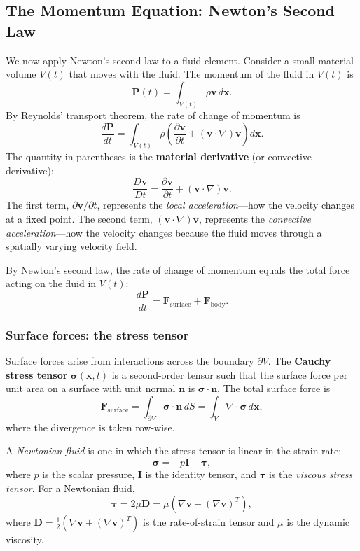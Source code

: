\subsection{The Momentum Equation: Newton's Second Law}

We now apply Newton's second law to a fluid element. Consider a small material volume $V(t)$ that moves with the fluid. The momentum of the fluid in $V(t)$ is
\[
\mathbf{P}(t) = \int_{V(t)} \rho \mathbf{v} \, d\mathbf{x}.
\]
By Reynolds' transport theorem, the rate of change of momentum is
\[
\frac{d\mathbf{P}}{dt} = \int_{V(t)} \rho \left( \frac{\partial \mathbf{v}}{\partial t} + (\mathbf{v} \cdot \nabla)\mathbf{v} \right) d\mathbf{x}.
\]
The quantity in parentheses is the \textbf{material derivative} (or convective derivative):
\[
\frac{D\mathbf{v}}{Dt} = \frac{\partial \mathbf{v}}{\partial t} + (\mathbf{v} \cdot \nabla)\mathbf{v}.
\]
The first term, $\partial \mathbf{v}/\partial t$, represents the \emph{local acceleration}---how the velocity changes at a fixed point. The second term, $(\mathbf{v} \cdot \nabla)\mathbf{v}$, represents the \emph{convective acceleration}---how the velocity changes because the fluid moves through a spatially varying velocity field.

By Newton's second law, the rate of change of momentum equals the total force acting on the fluid in $V(t)$:
\[
\frac{d\mathbf{P}}{dt} = \mathbf{F}_{\text{surface}} + \mathbf{F}_{\text{body}}.
\]

\subsubsection*{Surface forces: the stress tensor}

Surface forces arise from interactions across the boundary $\partial V$. The \textbf{Cauchy stress tensor} $\boldsymbol{\sigma}(\mathbf{x}, t)$ is a second-order tensor such that the surface force per unit area on a surface with unit normal $\mathbf{n}$ is $\boldsymbol{\sigma} \cdot \mathbf{n}$. The total surface force is
\[
\mathbf{F}_{\text{surface}} = \int_{\partial V} \boldsymbol{\sigma} \cdot \mathbf{n} \, dS = \int_V \nabla \cdot \boldsymbol{\sigma} \, d\mathbf{x},
\]
where the divergence is taken row-wise.

\begin{definition}
A \textit{Newtonian fluid} is one in which the stress tensor is linear in the strain rate:
\[
\boldsymbol{\sigma} = -p \mathbf{I} + \boldsymbol{\tau},
\]
where $p$ is the scalar pressure, $\mathbf{I}$ is the identity tensor, and $\boldsymbol{\tau}$ is the \textit{viscous stress tensor}. For a Newtonian fluid,
\[
\boldsymbol{\tau} = 2\mu \mathbf{D} = \mu \left( \nabla \mathbf{v} + (\nabla \mathbf{v})^T \right),
\]
where $\mathbf{D} = \frac{1}{2}\left( \nabla \mathbf{v} + (\nabla \mathbf{v})^T \right)$ is the rate-of-strain tensor and $\mu$ is the dynamic viscosity.
\end{definition}

